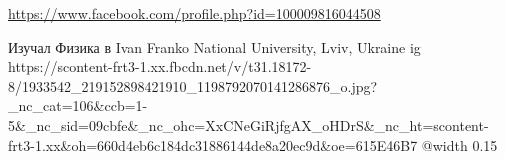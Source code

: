  
 
 
 
 

\url{https://www.facebook.com/profile.php?id=100009816044508}\par
Изучал Физика в Ivan Franko National University, Lviv, Ukraine
\ifcmt
  ig https://scontent-frt3-1.xx.fbcdn.net/v/t31.18172-8/1933542_219152898421910_1198792070141286876_o.jpg?_nc_cat=106&ccb=1-5&_nc_sid=09cbfe&_nc_ohc=XxCNeGiRjfgAX_oHDrS&_nc_ht=scontent-frt3-1.xx&oh=660d4eb6c184dc31886144de8a20ec9d&oe=615E46B7
  @width 0.15
\fi

